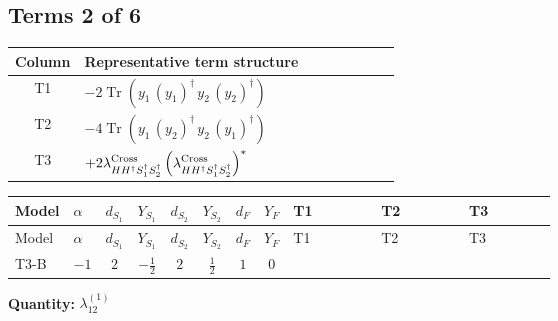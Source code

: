 \documentclass[8pt]{article}
\begin{document}
\begin{landscape}
\subsection*{Terms 2 of 6}
\begin{center}
\begin{tabular}{@{}c >{\raggedright\arraybackslash}p{0.82\linewidth}@{}}
\toprule
Column & Representative term structure \\
\midrule
T1 & \(\displaystyle -2 \operatorname{Tr}\!\left({y_1}\,\left({y_1}\right)^{\dagger}\,{y_2}\,\left({y_2}\right)^{\dagger}\right)\) \\
\midrule
T2 & \(\displaystyle -4 \operatorname{Tr}\!\left({y_1}\,\left({y_2}\right)^{\dagger}\,{y_2}\,\left({y_1}\right)^{\dagger}\right)\) \\
\midrule
T3 & \(\displaystyle +2 {\lambda_{H H^\dagger S_1^\dagger S_2^\dagger}^{\rm Cross}} \left({\lambda_{H H^\dagger S_1^\dagger S_2^\dagger}^{\rm Cross}}\right)^{*}\) \\
\midrule
\bottomrule
\end{tabular}
\end{center}
\smallskip
\tiny
\begin{longtable}{@{}llcccccc >{\raggedright\arraybackslash}p{0.21\linewidth} >{\raggedright\arraybackslash}p{0.21\linewidth} >{\raggedright\arraybackslash}p{0.21\linewidth}@{}}
\toprule
Model & $\alpha$ & $d_{S_1}$ & $Y_{S_1}$ & $d_{S_2}$ & $Y_{S_2}$ & $d_F$ & $Y_F$ & T1 & T2 & T3 \\
\midrule
\endfirsthead
\toprule
Model & $\alpha$ & $d_{S_1}$ & $Y_{S_1}$ & $d_{S_2}$ & $Y_{S_2}$ & $d_F$ & $Y_F$ & T1 & T2 & T3 \\
\midrule
\endhead
T3-B & $-1$ & $2$ & $-\frac{1}{2}$ & $2$ & $\frac{1}{2}$ & $1$ & $0$ & \scriptsize\adjustbox{max width=\linewidth}{$\begin{gathered} -2 \operatorname{Tr}\!\left({y_1}\,\left({y_1}\right)^{\dagger}\,{y_2}\,\left({y_2}\right)^{\dagger}\right)\end{gathered}$} & \scriptsize\adjustbox{max width=\linewidth}{$\begin{gathered} -4 \operatorname{Tr}\!\left({y_1}\,\left({y_2}\right)^{\dagger}\,{y_2}\,\left({y_1}\right)^{\dagger}\right)\end{gathered}$} & \scriptsize\adjustbox{max width=\linewidth}{$\begin{gathered} +2 {\lambda_{H H^\dagger S_1^\dagger S_2^\dagger}^{\rm Cross}} \left({\lambda_{H H^\dagger S_1^\dagger S_2^\dagger}^{\rm Cross}}\right)^{*}\end{gathered}$} \\
\midrule
\bottomrule
\end{longtable}
\clearpage
\noindent\textbf{Quantity: }$\lambda_{12}^{(1)}$\par\smallskip

\end{landscape}
\end{document}
